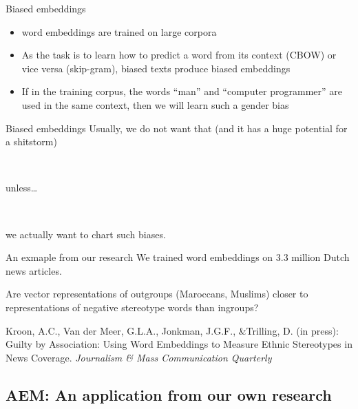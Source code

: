 \begin{frame}{Biased embeddings \cite{Bolukbasi2016}}
  \begin{itemize}
  \item word embeddings are trained on large corpora
  \item As the task is to learn how to predict a word from its context (CBOW) or vice versa (skip-gram), biased texts produce biased embeddings
  \item If in the training corpus, the words ``man'' and ``computer programmer'' are used in the same context, then we will learn such a gender bias
  \end{itemize}
  
\end{frame}


\begin{frame}{Biased embeddings}
  Usually, we do not want that (and it has a huge potential for a shitstorm)
  
  ~\\
  \pause
  
	unless\ldots
	
	~\\
	\pause
	
	we actually want to chart such biases.
	
\end{frame}


\begin{frame}{An exmaple from our research}
	We trained word embeddings on 3.3 million Dutch news articles.
	
	Are vector representations of outgroups (Maroccans, Muslims) closer to representations of negative stereotype words than ingroups?
	\vspace{.5cm}
	
	\tiny{Kroon, A.C., Van der Meer, G.L.A., Jonkman, J.G.F., \&Trilling, D. (in press): Guilty by Association: Using Word Embeddings to Measure Ethnic Stereotypes in News Coverage. \emph{Journalism \& Mass
			Communication Quarterly}}
\end{frame}


\begin{frame}[plain]
	
\end{frame}


\subsection[AEM]{AEM: An application from our own research}

